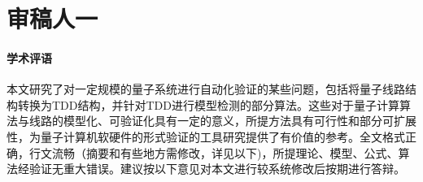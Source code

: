 \documentclass[10.5pt]{article} %
\begin{document}

% 
% 
% 
% 

\section*{审稿人一}
\paragraph{学术评语}
本文研究了对一定规模的量子系统进行自动化验证的某些问题，包括将量子线路结构转换为TDD结构，并针对TDD进行模型检测的部分算法。这些对于量子计算算法与线路的模型化、可验证化具有一定的意义，所提方法具有可行性和部分可扩展性，为量子计算机软硬件的形式验证的工具研究提供了有价值的参考。全文格式正确，行文流畅（摘要和有些地方需修改，详见以下)，所提理论、模型、公式、算法经验证无重大错误。建议按以下意见对本文进行较系统修改后按期进行答辩。
\end{document}
